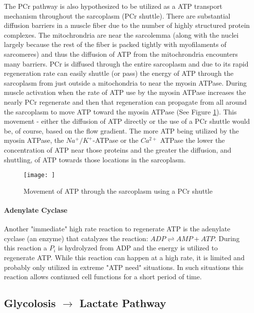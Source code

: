 The PCr pathway is also hypothesized to be utilized as a ATP transport mechanism throughout the sarcoplasm (PCr shuttle). There are substantial diffusion barriers in a muscle fiber due to the number of highly structured protein complexes. The mitochrondria are near the sarcolemma (along with the nuclei largely because the rest of the fiber is packed tightly with myofilaments of sarcomeres) and thus the diffusion of ATP from the mitochrondria encounters many barriers.  PCr is diffused through the entire sarcoplasm and due to its rapid regeneration rate can easily shuttle (or pass) the energy of ATP through the sarcoplasm from just outside a mitochondria to near the myosin ATPase. During muscle activation when the rate of ATP use by the myosin ATPase increases the nearly PCr regenerate and then that regeneration can propagate from all around the sarcoplasm to move ATP toward the myosin ATPase (See Figure \ref{fig:PCr}). This movement - either the diffusion of ATP directly or the use of a PCr shuttle would be, of course, based on the flow gradient. The more ATP being utilized by the myosin ATPase, the $Na^+/K^+$-ATPase or the $Ca^{2+}$ ATPase the lower the concentration of ATP near those proteins and the greater the diffusion, and shuttling, of ATP towards those locations in the sarcoplasm.

\begin{figure}[h!]
    \centering
    \texttt{[image: ]}
    \caption{Movement of ATP through the sarcoplasm using a PCr shuttle}
    \label{fig:PCr}
\end{figure}

\paragraph{Adenylate Cyclase}

Another "immediate" high rate reaction to regenerate ATP is the adenylate cyclase (an enzyme) that catalyzes the reaction: $ADP \rightleftharpoons AMP + ATP$. During this reaction a $P_i$ is hydrolyzed from ADP and the energy is utilized to regenerate ATP. While this reaction can happen at a high rate, it is limited and probably only utilized in extreme "ATP need" situations. In such situations this reaction allows continued cell functions for a short period of time. 

\subsection{Glycolosis $\rightarrow$ Lactate Pathway}

